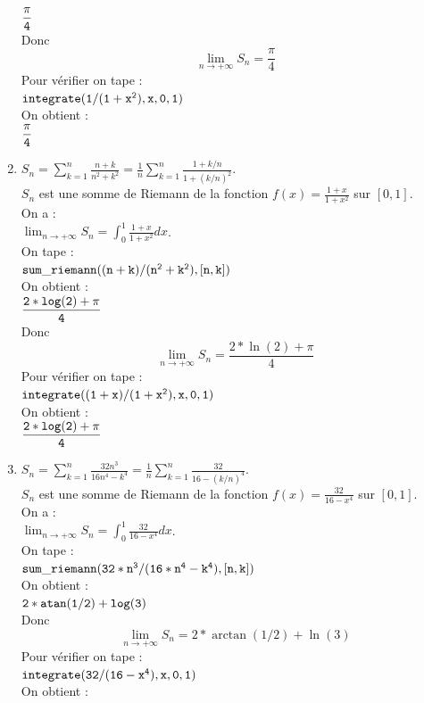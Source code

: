 \documentclass[a4paper,11pt]{book}
\begin{document}
\begin{enumerate}
${\tt \displaystyle\frac{\pi}{4}}$\\
Donc $$\displaystyle \lim_{n \rightarrow +\infty} S_n=\frac{\pi}{4}$$
Pour v\'erifier on tape :\\
${\tt integrate(1/(1+x^2),x,0,1)}$\\
On obtient :\\
${\tt \displaystyle\frac{\pi}{4}}$\\
\item
$\displaystyle S_n=\sum_{k=1}^n \frac{n+k}{n^2+k^2}=\frac{1}{n}\sum_{k=1}^n \frac{1+k/n}{1+(k/n)^2}$.\\
$S_n$ est une somme de Riemann de la fonction $\displaystyle f(x)=\frac{1+x}{1+x^2}$ sur $[0,1]$.\\
On a :\\
$\displaystyle \lim_{n \rightarrow +\infty} S_n=\int_0^1\frac{1+x}{1+x^2} dx$.\\
On tape :\\
${\tt sum\_riemann((n+k)/(n^2+k^2),[n,k])}$\\
On obtient :\\
${\tt \displaystyle \frac{2*log(2)+ \pi}{4}}$\\
Donc $$\displaystyle \lim_{n \rightarrow +\infty} S_n=\frac{2*\ln(2)+ \pi}{4}$$
Pour v\'erifier on tape :\\
${\tt integrate((1+x)/(1+x^2),x,0,1)}$\\
On obtient :\\
${\tt \displaystyle \frac{2*log(2)+ \pi}{4}}$\\
\item
$\displaystyle S_n=\sum_{k=1}^n \frac{32n^3}{16n^4-k^4}=\frac{1}{n}\sum_{k=1}^n \frac{32}{16-(k/n)^4}$.\\
$S_n$ est une somme de Riemann de la fonction $\displaystyle f(x)=\frac{32}{16-x^4}$ sur $[0,1]$.\\
On a :\\
$\displaystyle \lim_{n \rightarrow +\infty} S_n=\int_0^1\frac{32}{16-x^4} dx$.\\
On tape :\\
${\tt sum\_riemann(32*n^3/(16*n^4-k^4),[n,k])}$\\
On obtient :\\
${\tt 2*atan(1/2)+log(3)}$\\
Donc $$\displaystyle \lim_{n \rightarrow +\infty} S_n=2*\arctan(1/2)+\ln(3)$$
Pour v\'erifier on tape :\\
${\tt integrate(32/(16-x^4),x,0,1)}$\\
On obtient :\\

\end{enumerate}
\end{document}

